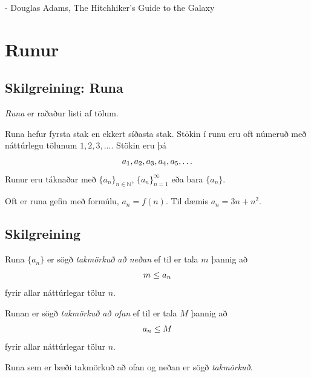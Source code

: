 \documentclass[a4paper,10pt,icelandic]{sphinxmanual}
\begin{document}
- Douglas Adams, The Hitchhiker's Guide to the Galaxy


\section{Runur}
\label{kafli09:index-0}\label{kafli09:runur}

\subsection{Skilgreining: Runa}
\label{kafli09:skilgreining-runa}
\emph{Runa} er raðaður listi af tölum.

Runa hefur fyrsta stak en ekkert síðasta stak. Stökin í runu eru oft
númeruð með náttúrlegu tölunum \(1, 2, 3, \ldots\). Stökin eru þá
\begin{gather}
\begin{split}a_1, a_2, a_3, a_4, a_5, \ldots\end{split}\notag
\end{gather}
Runur eru táknaðar með \(\{a_n\}_{n\in {{{\mathbb  N}}}}\),
\(\{a_n\}_{n=1}^\infty\) eða bara \(\{a_n\}\).

Oft er runa gefin með formúlu, \(a_n = f(n)\). Til dæmis
\(a_n = 3n + n^2\).


\subsection{Skilgreining}
\label{kafli09:index-1}\label{kafli09:skilgreining}
Runa \(\{a_n\}\) er sögð \emph{takmörkuð að neðan} ef til er tala
\(m\) þannig að
\begin{gather}
\begin{split}m\leq a_n\end{split}\notag
\end{gather}
fyrir allar náttúrlegar tölur \(n\).

Runan er sögð \emph{takmörkuð að ofan} ef til er tala \(M\) þannig að
\begin{gather}
\begin{split}a_n\leq M\end{split}\notag
\end{gather}
fyrir allar náttúrlegar tölur \(n\).

Runa sem er bæði takmörkuð að ofan og neðan er sögð \emph{takmörkuð}.

\end{document}
